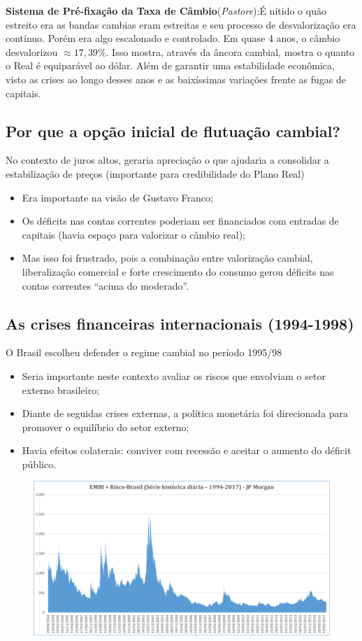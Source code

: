 \documentclass[a4paper,12pt]{article}[abntex2]
\begin{document}
\textbf{Sistema de Pré-fixação da Taxa de Câmbio}(\textit{Pastore}):É nítido o quão estreito era as bandas cambias eram estreitas e seu processo de desvalorização era contínuo. Porém era algo escalonado e controlado. Em quase 4 anos, o câmbio desvalorizou \(\approx 17,39\%\). Isso mostra, através da âncora  cambial, mostra o quanto o Real é equiparável ao dólar. Além de garantir uma estabilidade econômica, visto as crises ao longo desses anos e as baixíssimas variações frente as fugas de capitais.

\subsection{\textbf{Por que a opção inicial de flutuação cambial?}}

No contexto de juros altos, geraria apreciação o que ajudaria a consolidar a estabilização de preços (importante para credibilidade do Plano Real)\begin{itemize}
    \item Era importante na visão de Gustavo Franco;
    \item Os déficits nas contas correntes poderiam ser financiados com entradas de capitais (havia espaço para valorizar o câmbio real);
    \item Mas isso foi frustrado, pois a combinação entre valorização cambial, liberalização comercial e forte crescimento do consumo gerou déficits nas contas correntes “acima do moderado”.
\end{itemize}

\subsection{\textbf{As crises financeiras internacionais (1994-1998)}}
O Brasil escolheu defender o regime cambial no período 1995/98\begin{itemize}
    \item Seria importante neste contexto avaliar os riscos que envolviam o setor externo brasileiro;
    \item Diante de seguidas crises externas, a política monetária foi direcionada para promover o equilíbrio do setor externo;
    \item Havia efeitos colaterais: conviver com recessão e aceitar o aumento do déficit público. 
\end{itemize}

\begin{figure}[H]
    \centering
    \includegraphics[width=0.7\linewidth]{Imagens/a15i1.png}
\end{figure}
\end{document}
